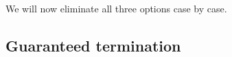 We will now eliminate all three options case by case. 
\subsubsection{}
\subsubsection{}
\subsubsection{}

\subsection{Guaranteed termination}



